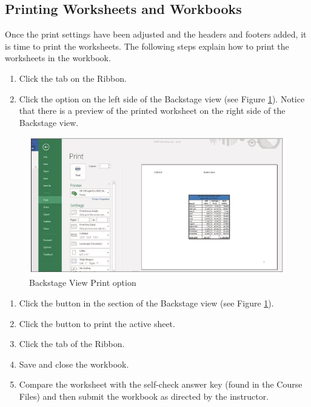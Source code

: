 \subsection{Printing Worksheets and Workbooks}

Once the print settings have been adjusted and the headers and footers added, it is time to print the worksheets. The following steps explain how to print the worksheets in the  workbook.

\begin{enumerate}
	\item Click the  tab on the Ribbon.
	\item Click the  option on the left side of the Backstage view (see Figure \ref{01:fig52}). Notice that there is a preview of the printed worksheet on the right side of the Backstage view.
\end{enumerate}

\begin{figure}[H]
	\centering
	\includegraphics[width=\maxwidth{.95\linewidth}]{gfx/ch01_fig52}
	\caption{Backstage View Print option}
	\label{01:fig52}
\end{figure}

\begin{enumerate}[resume]
	\item Click the  button in the  section of the Backstage view (see Figure \ref{01:fig52}).
	\item Click the  button to print the active sheet.
	\item Click the  tab of the Ribbon.
	\item Save and close the  workbook.
	\item Compare the worksheet with the self-check answer key (found in the Course Files) and then submit the  workbook as directed by the instructor.
\end{enumerate}

